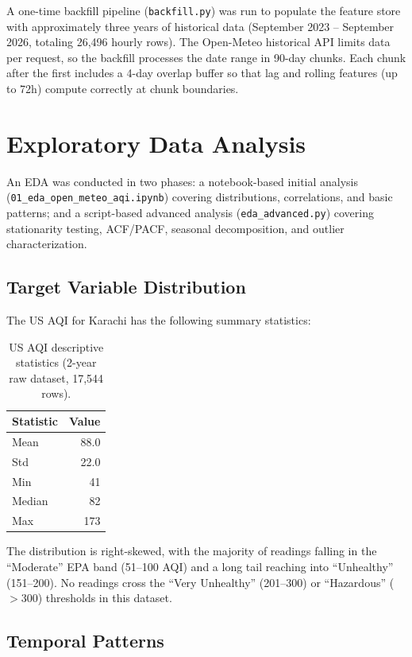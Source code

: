 \documentclass[12pt, a4paper]{article}
\begin{document}
A one-time backfill pipeline (\texttt{backfill.py}) was run to populate the feature store with approximately three years of historical data (September 2023 -- September 2026, totaling 26,496 hourly rows).  The Open-Meteo historical API limits data per request, so the backfill processes the date range in 90-day chunks.  Each chunk after the first includes a 4-day overlap buffer so that lag and rolling features (up to 72h) compute correctly at chunk boundaries.


\section{Exploratory Data Analysis}

An EDA was conducted in two phases: a notebook-based initial analysis (\texttt{01\_eda\_open\_meteo\_aqi.ipynb}) covering distributions, correlations, and basic patterns; and a script-based advanced analysis (\texttt{eda\_advanced.py}) covering stationarity testing, ACF/PACF, seasonal decomposition, and outlier characterization.

\subsection{Target Variable Distribution}

The US AQI for Karachi has the following summary statistics:

\begin{table}[H]
\centering
\caption{US AQI descriptive statistics (2-year raw dataset, 17,544 rows).}
\begin{tabular}{lr}
\toprule
\textbf{Statistic} & \textbf{Value} \\
\midrule
Mean   & 88.0 \\
Std    & 22.0 \\
Min    & 41 \\
Median & 82 \\
Max    & 173 \\
\bottomrule
\end{tabular}
\end{table}

The distribution is right-skewed, with the majority of readings falling in the ``Moderate'' EPA band (51--100 AQI) and a long tail reaching into ``Unhealthy'' (151--200).  No readings cross the ``Very Unhealthy'' (201--300) or ``Hazardous'' ($>$300) thresholds in this dataset.

\subsection{Temporal Patterns}
\end{document}
